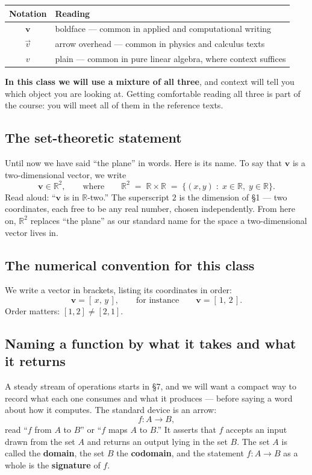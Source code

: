 \documentclass[11pt]{article}
\theoremstyle{definition}
\theoremstyle{remark}
\newcommand{\R}{\mathbb{R}}
\newcommand{\vc}[1]{\mathbf{#1}}
\begin{document}
\begin{center}
\renewcommand{\arraystretch}{1.35}
\begin{tabular}{@{}c l@{}}
\toprule
\textbf{Notation} & \textbf{Reading} \\
\midrule
$\vc{v}$      & boldface --- common in applied and computational writing \\
$\vec{v}$     & arrow overhead --- common in physics and calculus texts \\
$v$           & plain --- common in pure linear algebra, where context suffices \\
\bottomrule
\end{tabular}
\end{center}

\noindent\textbf{In this class we will use a mixture of all three}, and context
will tell you which object you are looking at. Getting comfortable reading all
three is part of the course: you will meet all of them in the reference texts.

\subsection*{The set-theoretic statement}
Until now we have said ``the plane'' in words. Here is its name. To say that
$\vc{v}$ is a two-dimensional vector, we write
\[
  \vc{v}\in\R^{2},
  \qquad\text{where}\qquad
  \R^{2}\;=\;\R\times\R\;=\;\bigl\{(x,y)\;:\;x\in\R,\;y\in\R\bigr\}.
\]
Read aloud: ``$\vc{v}$ is in $\R$-two.'' The superscript $2$ is the dimension of
\S1 --- two coordinates, each free to be any real number, chosen independently.
From here on, $\R^{2}$ replaces ``the plane'' as our standard name for the space
a two-dimensional vector lives in.

\subsection*{The numerical convention for this class}
We write a vector in brackets, listing its coordinates in order:
\[
  \vc{v}=[\,x,\,y\,],
  \qquad\text{for instance}\qquad
  \vc{v}=[\,1,\,2\,].
\]
Order matters: $[1,2]\neq[2,1]$.

\subsection*{Naming a function by what it takes and what it returns}
A steady stream of operations starts in \S7, and we will want a compact way to
record what each one consumes and what it produces --- before saying a word
about how it computes. The standard device is an arrow:
\[
  f : A \to B ,
\]
read ``$f$ from $A$ to $B$'' or ``$f$ maps $A$ to $B$.'' It asserts that $f$
accepts an input drawn from the set $A$ and returns an output lying in the set
$B$. The set $A$ is called the \textbf{domain}, the set $B$ the
\textbf{codomain}, and the statement $f:A\to B$ as a whole is the
\textbf{signature} of $f$.
\end{document}
